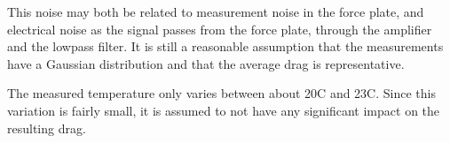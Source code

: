 



This noise may both be related to measurement noise in the force plate, and electrical noise as the signal passes from the force plate, through the amplifier and the lowpass filter. It is still a reasonable assumption that the measurements have a Gaussian distribution and that the average drag is representative. 

The measured temperature only varies between about 20\degree C and 23\degree C. Since this variation is fairly small, it is assumed to not have any significant impact on the resulting drag. 








